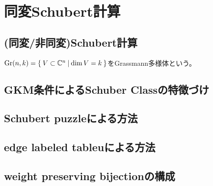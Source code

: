 \section{同変Schubert計算}
\subsection{(同変/非同変)Schubert計算}
$\text{Gr}(n, k)=\left\{\:V\subset \mathbb{C}^n\:\middle|\:\dim V = k\:\right\}$をGrassmann多様体という。

\subsection{GKM条件によるSchuber Classの特徴づけ}

\subsection{Schubert puzzleによる方法}

\subsection{edge labeled tableuによる方法}

\subsection{weight preserving bijectionの構成}